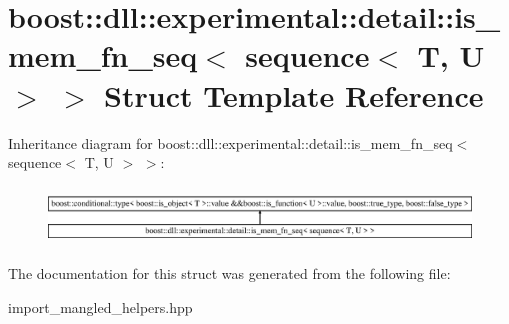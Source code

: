 \hypertarget{a01524}{}\section{boost\+:\+:dll\+:\+:experimental\+:\+:detail\+:\+:is\+\_\+mem\+\_\+fn\+\_\+seq$<$ sequence$<$ T, U $>$ $>$ Struct Template Reference}
\label{a01524}
Inheritance diagram for boost\+:\+:dll\+:\+:experimental\+:\+:detail\+:\+:is\+\_\+mem\+\_\+fn\+\_\+seq$<$ sequence$<$ T, U $>$ $>$\+:\begin{figure}[H]
\begin{center}
\leavevmode
\includegraphics[height=1.566434cm]{a01524}
\end{center}
\end{figure}


The documentation for this struct was generated from the following file\+:\begin{DoxyCompactItemize}
\item 
import\+\_\+mangled\+\_\+helpers.\+hpp\end{DoxyCompactItemize}
